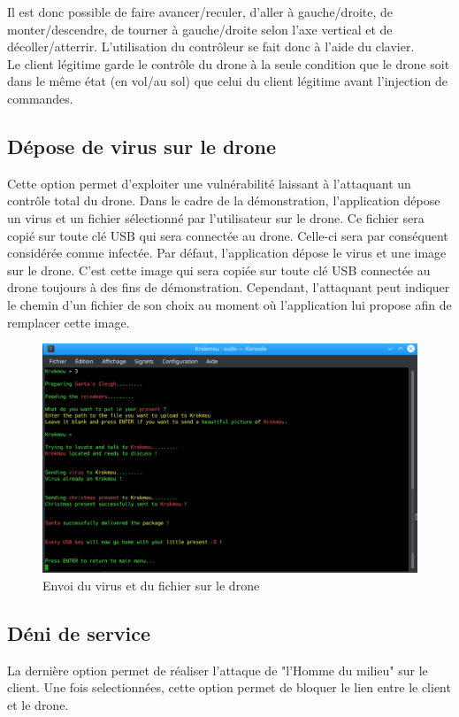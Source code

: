 Il est donc possible de faire avancer/reculer, d'aller à gauche/droite, de monter/descendre, de tourner à gauche/droite selon l'axe vertical et de décoller/atterrir. L'utilisation du contrôleur se fait donc à l'aide du clavier. \\
Le client légitime garde le contrôle du drone à la seule condition que le drone soit dans le même état (en vol/au sol) que celui du client légitime avant l'injection de commandes.

\subsection{Dépose de virus sur le drone}
Cette option permet d'exploiter une vulnérabilité laissant à l'attaquant un contrôle total du drone. Dans le cadre de la démonstration, l'application dépose un virus et un fichier sélectionné par l'utilisateur sur le drone. Ce fichier sera copié sur toute clé USB qui sera connectée au drone. Celle-ci sera par conséquent considérée comme infectée. Par défaut, l'application dépose le virus et une image sur le drone. C'est cette image qui sera copiée sur toute clé USB connectée au drone toujours à des fins de démonstration. Cependant, l'attaquant peut indiquer le chemin d'un fichier de son choix au moment où l'application lui propose afin de remplacer cette image.

\begin{figure}[H]
  \centering
  \includegraphics[scale=0.3]{images/virus.png}
  \caption{Envoi du virus et du fichier sur le drone}
\end{figure}

\subsection{Déni de service}
La dernière option permet de réaliser l'attaque de "l'Homme du milieu" sur le client. Une fois selectionnées, cette option permet de bloquer le lien entre le client et le drone.

